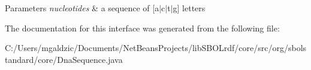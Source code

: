 \begin{DoxyParams}{Parameters}
{\em nucleotides} & a sequence of \mbox{[}a$|$c$|$t$|$g\mbox{]} letters \\
\hline
\end{DoxyParams}


The documentation for this interface was generated from the following file:\begin{DoxyCompactItemize}
\item 
C:/Users/mgaldzic/Documents/NetBeansProjects/libSBOLrdf/core/src/org/sbolstandard/core/DnaSequence.java\end{DoxyCompactItemize}
